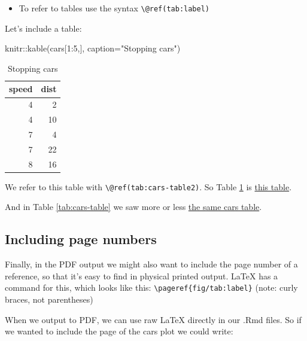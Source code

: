 \documentclass[a4paper, nobind]{templates/ociamthesis}
\providecommand{\tightlist}{%
  \setlength{\itemsep}{0pt}\setlength{\parskip}{0pt}}
\newenvironment{Shaded}{\begin{snugshade}}{\end{snugshade}}
\newcommand{\AttributeTok}[1]{\textcolor[rgb]{0.77,0.63,0.00}{#1}}
\newcommand{\DecValTok}[1]{\textcolor[rgb]{0.00,0.00,0.81}{#1}}
\newcommand{\FunctionTok}[1]{\textcolor[rgb]{0.00,0.00,0.00}{#1}}
\newcommand{\NormalTok}[1]{#1}
\newcommand{\SpecialCharTok}[1]{\textcolor[rgb]{0.00,0.00,0.00}{#1}}
\newcommand{\StringTok}[1]{\textcolor[rgb]{0.31,0.60,0.02}{#1}}
\renewenvironment{Shaded}
{
  \vspace{10pt}%
  \begin{snugshade}%
}{%
  \end{snugshade}%
  \vspace{8pt}%
}
\begin{document}
\begin{itemize}
\tightlist
\item
  To refer to tables use the syntax \texttt{\textbackslash{}@ref(tab:label)}
\end{itemize}

Let's include a table:

\begin{Shaded}
\begin{Highlighting}[]
\NormalTok{knitr}\SpecialCharTok{::}\FunctionTok{kable}\NormalTok{(cars[}\DecValTok{1}\SpecialCharTok{:}\DecValTok{5}\NormalTok{,],}
            \AttributeTok{caption=}\StringTok{"Stopping cars"}\NormalTok{)}
\end{Highlighting}
\end{Shaded}

\begin{table}

\caption{\label{tab:cars-table2}Stopping cars}
\centering
\begin{tabular}[t]{r|r}
\hline
speed & dist\\
\hline
4 & 2\\
\hline
4 & 10\\
\hline
7 & 4\\
\hline
7 & 22\\
\hline
8 & 16\\
\hline
\end{tabular}
\end{table}

We refer to this table with \texttt{\textbackslash{}@ref(tab:cars-table2)}.
So Table \ref{tab:cars-table2} is \protect\hyperlink{tab:cars-table2}{this table}.

And in Table \ref{tab:cars-table} we saw more or less \protect\hyperlink{tab:cars-table}{the same cars table}.

\hypertarget{including-page-numbers}{%
\subsection{Including page numbers}\label{including-page-numbers}}

Finally, in the PDF output we might also want to include the page number of a reference, so that it's easy to find in physical printed output.
LaTeX has a command for this, which looks like this: \texttt{\textbackslash{}pageref\{fig/tab:label\}} (note: curly braces, not parentheses)

When we output to PDF, we can use raw LaTeX directly in our .Rmd files. So if we wanted to include the page of the cars plot we could write:
\end{document}
